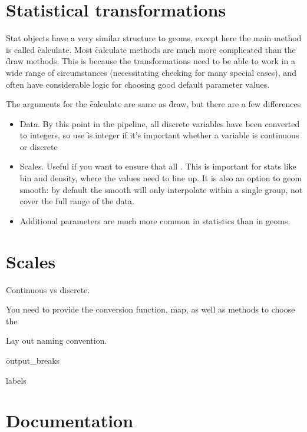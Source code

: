 \section{Statistical transformations}
\label{sec:own-stat}

Stat objects have a very similar structure to geoms, except here the main method is called \f{calculate}.  Most \f{calculate} methods are much more complicated than the \f{draw} methods.  This is because the transformations need to be able to work in a wide range of circumstances (necessitating checking for many special cases), and often have considerable logic for choosing good default parameter values.

The arguments for the \f{calculate} are same as \f{draw}, but there are a few differences

\begin{itemize}
  \item Data. By this point in the pipeline, all discrete variables have been converted to integers, so use \f{is.integer} if it's important whether a variable is continuous or discrete
  
  \item Scales.  Useful if you want to ensure that all .  This is important for stats like bin and density, where the values need to line up.  It is also an option to geom smooth: by default the smooth will only interpolate within a single group, not cover the full range of the data.

  \item Additional parameters are much more common in statistics than in geoms.
\end{itemize}

\section{Scales}
\label{sec:own-scale}

Continuous vs discrete.  

You need to provide the conversion function, \f{map}, as well as methods to choose the 

Lay out naming convention.


\f{output_breaks}

\f{labels}

\section{Documentation}
\label{sec:documentation}

